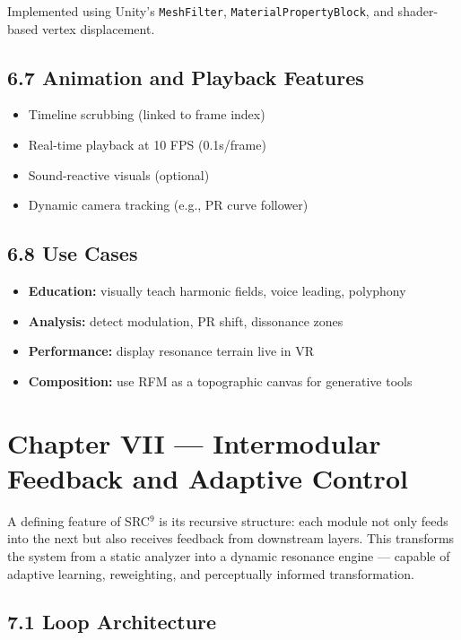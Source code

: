 \documentclass[10pt]{article}
\begin{document}
Implemented using Unity’s \texttt{MeshFilter}, \texttt{MaterialPropertyBlock}, and shader-based vertex displacement.

\subsection*{6.7 Animation and Playback Features}

\begin{itemize}
    \item Timeline scrubbing (linked to frame index)
    \item Real-time playback at 10 FPS (0.1s/frame)
    \item Sound-reactive visuals (optional)
    \item Dynamic camera tracking (e.g., PR curve follower)
\end{itemize}

\subsection*{6.8 Use Cases}

\begin{itemize}
    \item \textbf{Education:} visually teach harmonic fields, voice leading, polyphony
    \item \textbf{Analysis:} detect modulation, PR shift, dissonance zones
    \item \textbf{Performance:} display resonance terrain live in VR
    \item \textbf{Composition:} use RFM as a topographic canvas for generative tools
\end{itemize}

\section*{Chapter VII — Intermodular Feedback and Adaptive Control}

A defining feature of SRC$^{9}$ is its recursive structure: each module not only feeds into the next but also receives feedback from downstream layers. This transforms the system from a static analyzer into a dynamic resonance engine — capable of adaptive learning, reweighting, and perceptually informed transformation.

\subsection*{7.1 Loop Architecture}
\end{document}
